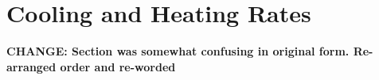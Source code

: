 \documentclass[twocolumn]{aastex61}
\begin{document}
\setcounter{figure}{0}
\section{Cooling and Heating Rates}
\label{appendix:cooling}
\textbf{CHANGE: Section was somewhat confusing in original form. Re-arranged order and re-worded}


\end{document}
